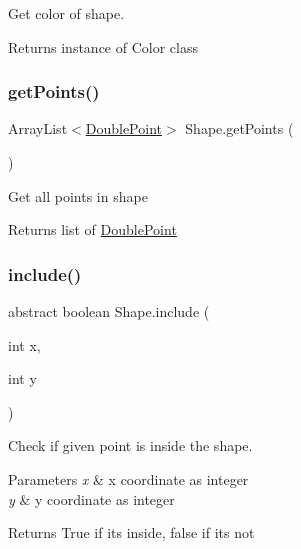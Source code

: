 Get color of shape. \begin{DoxyReturn}{Returns}
instance of Color class 
\end{DoxyReturn}
\mbox{\label{class_shape_acced47c85afcddf20b66f1820b86584a}} 
\subsubsection{\texorpdfstring{get\+Points()}{getPoints()}}
{\footnotesize\ttfamily Array\+List$<$\hyperlink{class_double_point}{Double\+Point}$>$ Shape.\+get\+Points (\begin{DoxyParamCaption}{ }\end{DoxyParamCaption})}

Get all points in shape \begin{DoxyReturn}{Returns}
list of \hyperlink{class_double_point}{Double\+Point} 
\end{DoxyReturn}
\mbox{\label{class_shape_ada4e95f3d5340e22d9f51db227b16daa}} 
\subsubsection{\texorpdfstring{include()}{include()}}
{\footnotesize\ttfamily abstract boolean Shape.\+include (\begin{DoxyParamCaption}\item[{int}]{x,  }\item[{int}]{y }\end{DoxyParamCaption})\hspace{0.3cm}{\ttfamily [abstract]}}

Check if given point is inside the shape. 
\begin{DoxyParams}{Parameters}
{\em x} & x coordinate as integer \\
\hline
{\em y} & y coordinate as integer \\
\hline
\end{DoxyParams}
\begin{DoxyReturn}{Returns}
True if it\textquotesingle{}s inside, false if it\textquotesingle{}s not 
\end{DoxyReturn}
\mbox{\label{class_shape_a2b1385526d1687f2bf2c382aab40cef4}} 
